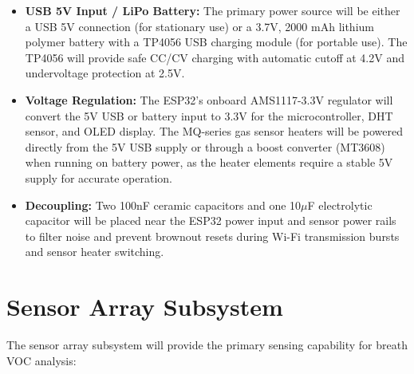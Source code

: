 \begin{itemize}[leftmargin=1.5cm]
\item \textbf{USB 5V Input / LiPo Battery:} The primary power source will be either a USB 5V connection (for stationary use) or a 3.7V, 2000 mAh lithium polymer battery with a TP4056 USB charging module (for portable use). The TP4056 will provide safe CC/CV charging with automatic cutoff at 4.2V and undervoltage protection at 2.5V.

\item \textbf{Voltage Regulation:} The ESP32's onboard AMS1117-3.3V regulator will convert the 5V USB or battery input to 3.3V for the microcontroller, DHT sensor, and OLED display. The MQ-series gas sensor heaters will be powered directly from the 5V USB supply or through a boost converter (MT3608) when running on battery power, as the heater elements require a stable 5V supply for accurate operation.

\item \textbf{Decoupling:} Two 100nF ceramic capacitors and one 10$\mu$F electrolytic capacitor will be placed near the ESP32 power input and sensor power rails to filter noise and prevent brownout resets during Wi-Fi transmission bursts and sensor heater switching.
\end{itemize}

\section{Sensor Array Subsystem}
The sensor array subsystem will provide the primary sensing capability for breath VOC analysis:

